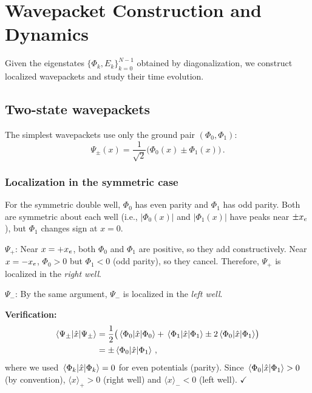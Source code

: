 \section{Wavepacket Construction and Dynamics}\label{sec:wavepackets}

Given the eigenstates $\{\Phi_k, E_k\}_{k=0}^{N-1}$ obtained by diagonalization,
we construct localized wavepackets and study their time evolution.

\subsection{Two-state wavepackets}\label{sec:2state}

The simplest wavepackets use only the ground pair $(\Phi_0, \Phi_1)$:
\begin{equation}\label{eq:Psi_pm}
  \Psi_\pm(x) = \frac{1}{\sqrt{2}}\bigl(\Phi_0(x) \pm \Phi_1(x)\bigr)\,.
\end{equation}

\subsubsection{Localization in the symmetric case}

For the symmetric double well, $\Phi_0$ has even parity and $\Phi_1$ has odd parity.
Both are symmetric about each well (i.e., $|\Phi_0(x)|$ and $|\Phi_1(x)|$ have peaks
near $\pm x_e$), but $\Phi_1$ changes sign at $x = 0$.

$\Psi_+$: Near $x = +x_e$, both $\Phi_0$ and $\Phi_1$ are positive, so they add
constructively. Near $x = -x_e$, $\Phi_0 > 0$ but $\Phi_1 < 0$ (odd parity), so
they cancel. Therefore, $\Psi_+$ is localized in the \emph{right well}.

$\Psi_-$: By the same argument, $\Psi_-$ is localized in the \emph{left well}.

\textbf{Verification:}
\begin{align}
  \langle\Psi_\pm|\hat{x}|\Psi_\pm\rangle
  &= \frac{1}{2}\bigl(\mel{\Phi_0}{\hat{x}}{\Phi_0} + \mel{\Phi_1}{\hat{x}}{\Phi_1}
     \pm 2\mel{\Phi_0}{\hat{x}}{\Phi_1}\bigr)\notag\\
  &= \pm\mel{\Phi_0}{\hat{x}}{\Phi_1}\,,
\end{align}
where we used $\mel{\Phi_k}{\hat{x}}{\Phi_k} = 0$ for even potentials (parity).
Since $\mel{\Phi_0}{\hat{x}}{\Phi_1} > 0$ (by convention), $\langle x\rangle_+ > 0$
(right well) and $\langle x\rangle_- < 0$ (left well). $\checkmark$

